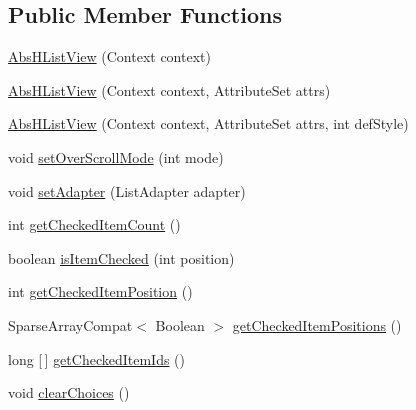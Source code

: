 \subsection*{Public Member Functions}
\begin{DoxyCompactItemize}
\item 
\hyperlink{classit_1_1sephiroth_1_1android_1_1library_1_1widget_1_1_abs_h_list_view_a708660de8c81f7e910304fda2c6f05a8}{Abs\+H\+List\+View} (Context context)
\item 
\hyperlink{classit_1_1sephiroth_1_1android_1_1library_1_1widget_1_1_abs_h_list_view_a4f0bab3a972a64c9330443fd765effdb}{Abs\+H\+List\+View} (Context context, Attribute\+Set attrs)
\item 
\hyperlink{classit_1_1sephiroth_1_1android_1_1library_1_1widget_1_1_abs_h_list_view_a8959e1b10f7aced046465b1cbe4d3368}{Abs\+H\+List\+View} (Context context, Attribute\+Set attrs, int def\+Style)
\item 
void \hyperlink{classit_1_1sephiroth_1_1android_1_1library_1_1widget_1_1_abs_h_list_view_a0971126412b5edbb661a64351a946d6a}{set\+Over\+Scroll\+Mode} (int mode)
\item 
void \hyperlink{classit_1_1sephiroth_1_1android_1_1library_1_1widget_1_1_abs_h_list_view_acb129c34098bd2b815cd7990db647624}{set\+Adapter} (List\+Adapter adapter)
\item 
int \hyperlink{classit_1_1sephiroth_1_1android_1_1library_1_1widget_1_1_abs_h_list_view_a301cf69cc4195b012762ac522e99493c}{get\+Checked\+Item\+Count} ()
\item 
boolean \hyperlink{classit_1_1sephiroth_1_1android_1_1library_1_1widget_1_1_abs_h_list_view_a0f15cbb85f79e9adf6fb4669285de830}{is\+Item\+Checked} (int position)
\item 
int \hyperlink{classit_1_1sephiroth_1_1android_1_1library_1_1widget_1_1_abs_h_list_view_a5c1a4a6cf2cda5d86b506cc048ac8155}{get\+Checked\+Item\+Position} ()
\item 
Sparse\+Array\+Compat$<$ Boolean $>$ \hyperlink{classit_1_1sephiroth_1_1android_1_1library_1_1widget_1_1_abs_h_list_view_ab624d6eb210c1c99a9a8646dbeb0c944}{get\+Checked\+Item\+Positions} ()
\item 
long \mbox{[}$\,$\mbox{]} \hyperlink{classit_1_1sephiroth_1_1android_1_1library_1_1widget_1_1_abs_h_list_view_a7a212bc367d2dc31f48e313e6f3ef9cf}{get\+Checked\+Item\+Ids} ()
\item 
void \hyperlink{classit_1_1sephiroth_1_1android_1_1library_1_1widget_1_1_abs_h_list_view_a082c14ba0bd9a1adddd77078bfbb0016}{clear\+Choices} ()

\end{DoxyCompactItemize}
